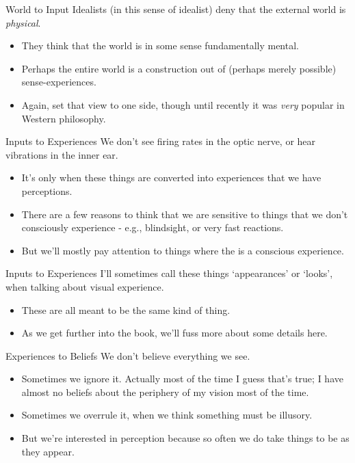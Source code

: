 \documentclass[
  17pt,
  letterpaper,
  ignorenonframetext,
  aspectratio=169,
]{beamer}
\providecommand{\tightlist}{%
  \setlength{\itemsep}{0pt}\setlength{\parskip}{0pt}}\usepackage{longtable,booktabs,array}
\begin{document}
\begin{frame}{World to Input}
\protect\hypertarget{world-to-input}{}
Idealists (in this sense of idealist) deny that the external world is
\emph{physical}.

\begin{itemize}[<+->]
\tightlist
\item
  They think that the world is in some sense fundamentally mental.
\item
  Perhaps the entire world is a construction out of (perhaps merely
  possible) sense-experiences.
\item
  Again, set that view to one side, though until recently it was
  \emph{very} popular in Western philosophy.
\end{itemize}
\end{frame}

\begin{frame}{Inputs to Experiences}
\protect\hypertarget{inputs-to-experiences}{}
We don't see firing rates in the optic nerve, or hear vibrations in the
inner ear.

\begin{itemize}[<+->]
\tightlist
\item
  It's only when these things are converted into experiences that we
  have perceptions.
\item
  There are a few reasons to think that we are sensitive to things that
  we don't consciously experience - e.g., blindsight, or very fast
  reactions.
\item
  But we'll mostly pay attention to things where the is a conscious
  experience.
\end{itemize}
\end{frame}

\begin{frame}{Inputs to Experiences}
\protect\hypertarget{inputs-to-experiences-1}{}
I'll sometimes call these things `appearances' or `looks', when talking
about visual experience.

\begin{itemize}[<+->]
\tightlist
\item
  These are all meant to be the same kind of thing.
\item
  As we get further into the book, we'll fuss more about some details
  here.
\end{itemize}
\end{frame}

\begin{frame}{Experiences to Beliefs}
\protect\hypertarget{experiences-to-beliefs}{}
We don't believe everything we see.

\begin{itemize}[<+->]
\tightlist
\item
  Sometimes we ignore it. Actually most of the time I guess that's true;
  I have almost no beliefs about the periphery of my vision most of the
  time.
\item
  Sometimes we overrule it, when we think something must be illusory.
\item
  But we're interested in perception because so often we do take things
  to be as they appear.
\end{itemize}
\end{frame}
\end{document}
